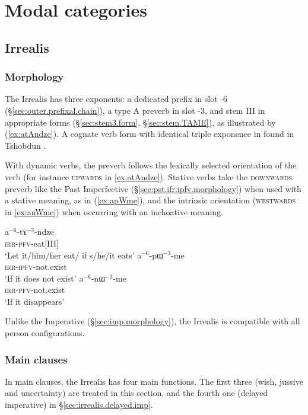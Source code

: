 \section{Modal categories} \label{sec:TAME.modal}
\subsection{Irrealis} \label{sec:irrealis}
 
\subsubsection{Morphology} \label{sec:irrealis.morphology}
The Irrealis has three exponents: a dedicated prefix  in slot -6 (§\ref{sec:outer.prefixal.chain}), a type A preverb in slot -3, and stem III in appropriate forms (§\ref{sec:stem3.form}, §\ref{sec:stem.TAME}), as illustrated by (\ref{ex:atAndze}). A cognate verb form with identical triple exponence in found in Tshobdun \citep{jackson07irrealis}.

With dynamic verbs, the preverb follows the lexically selected orientation of the verb (for instance  \textsc{upwards} in \ref{ex:atAndze}). Stative verbs take the \textsc{downwards}  preverb like the Past Imperfective (§\ref{sec:pst.ifr.ipfv.morphology}) when used with a stative meaning, as in (\ref{ex:apWme}), and the intrinsic orientation (\textsc{westwards} in \ref{ex:anWme}) when occurring with an inchoative meaning.

\begin{exe}
\ex 
\begin{xlist}
\ex \label{ex:atAndze}
\gll a$^{-6}$-tɤ$^{-3}$-ndze \\
\textsc{irr}-\textsc{pfv}-eat[III] \\
\glt `Let it/him/her eat/ if s/he/it eats'
\ex \label{ex:apWme}
\gll a$^{-6}$-pɯ$^{-3}$-me \\
 \textsc{irr}-\textsc{ipfv}-not.exist \\
 \glt `If it does not exist'
\ex \label{ex:anWme}
\gll a$^{-6}$-nɯ$^{-3}$-me \\
 \textsc{irr}-\textsc{pfv}-not.exist \\
 \glt `If it disappears'
\end{xlist}
\end{exe}

Unlike the Imperative (§\ref{sec:imp.morphology}), the Irrealis is compatible with all person configurations.

\subsubsection{Main clauses} \label{sec:irrealis.main}
In main clauses, the Irrealis has four main functions. The first three (wish, jussive and uncertainty) are treated in this section, and the fourth one (delayed imperative) in §\ref{sec:irrealis.delayed.imp}.

